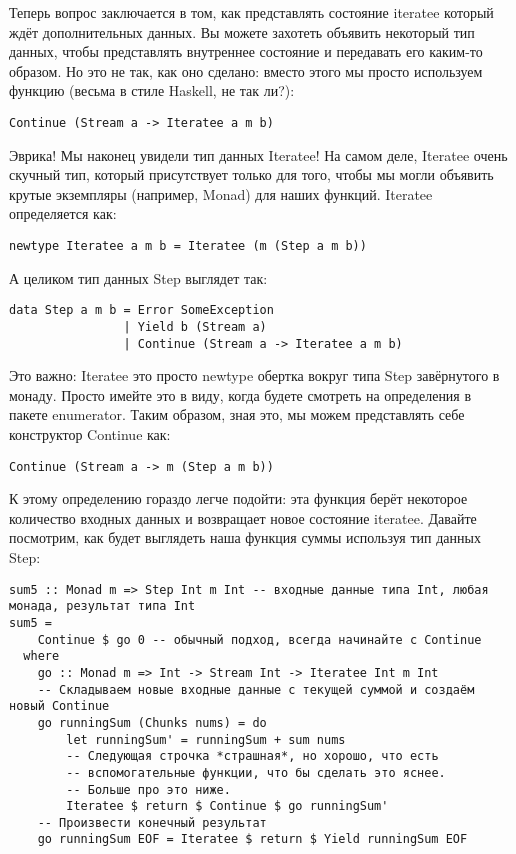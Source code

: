 Теперь вопрос заключается в том, как представлять состояние iteratee который ждёт дополнительных данных. Вы можете захотеть объявить некоторый тип данных, чтобы представлять внутреннее состояние и передавать его каким-то образом. Но это не так, как оно сделано: вместо этого мы просто используем функцию (весьма в стиле Haskell, не так ли?):

\begin{lstlisting}
Continue (Stream a -> Iteratee a m b)
\end{lstlisting}

Эврика! Мы наконец увидели тип данных Iteratee! На самом деле, Iteratee очень скучный тип, который присутствует только для того, чтобы мы могли объявить крутые экземпляры (например, Monad) для наших функций. Iteratee определяется как:

\begin{lstlisting}
newtype Iteratee a m b = Iteratee (m (Step a m b))
\end{lstlisting}

А целиком тип данных Step выглядет так:

\begin{lstlisting}
data Step a m b = Error SomeException 
                | Yield b (Stream a) 
                | Continue (Stream a -> Iteratee a m b)
\end{lstlisting}

Это важно: Iteratee это просто newtype обертка вокруг типа Step завёрнутого в монаду. Просто имейте это в виду, когда будете смотреть на определения в пакете enumerator. Таким образом, зная это, мы можем представлять себе конструктор Continue как:

\begin{lstlisting}
Continue (Stream a -> m (Step a m b))
\end{lstlisting}

К этому определению гораздо легче подойти: эта функция берёт некоторое количество входных данных и возвращает новое состояние iteratee. Давайте посмотрим, как будет выглядеть наша функция суммы используя тип данных Step:

\begin{lstlisting}
sum5 :: Monad m => Step Int m Int -- входные данные типа Int, любая монада, результат типа Int
sum5 =
    Continue $ go 0 -- обычный подход, всегда начинайте с Continue
  where
    go :: Monad m => Int -> Stream Int -> Iteratee Int m Int
    -- Складываем новые входные данные с текущей суммой и создаём новый Continue
    go runningSum (Chunks nums) = do
        let runningSum' = runningSum + sum nums
        -- Следующая строчка *страшная*, но хорошо, что есть 
        -- вспомогательные функции, что бы сделать это яснее.
        -- Больше про это ниже.
        Iteratee $ return $ Continue $ go runningSum'
    -- Произвести конечный результат
    go runningSum EOF = Iteratee $ return $ Yield runningSum EOF
\end{lstlisting}

